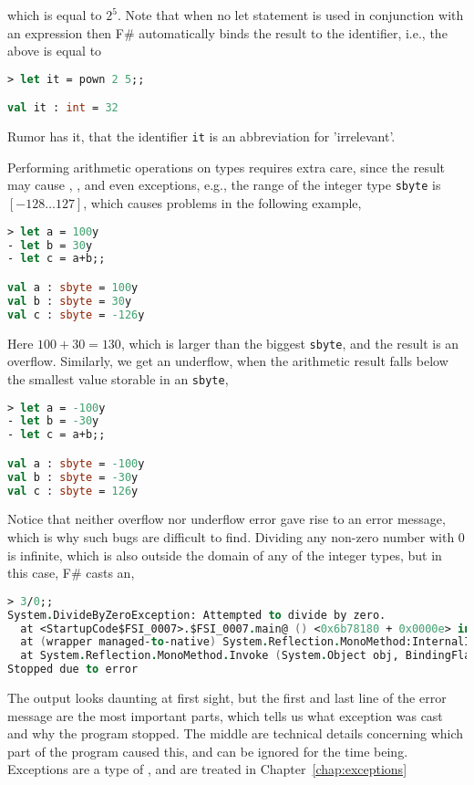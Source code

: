which is equal to $2^5$. Note that when no let statement is used in conjunction with an expression then F\# automatically binds the result to the  identifier, i.e., the above is equal to
%
\begin{lstlisting}[language=fsharp,caption={fsharpi, the equivalent to the irrelevant identifier.}]
  > let it = pown 2 5;;

val it : int = 32
\end{lstlisting}
Rumor has it, that the identifier \lstinline|it| is an abbreviation for 'irrelevant'.

Performing arithmetic operations on  types requires extra care, since the result may cause , , and even exceptions, e.g., the range of the integer type \lstinline|sbyte| is $[-128\ldots 127]$, which causes problems in the following example,
%
\begin{lstlisting}[language=fsharp,caption={fsharpi, adding integers may cause overflow.},label=overflow]
> let a = 100y 
- let b = 30y 
- let c = a+b;;

val a : sbyte = 100y
val b : sbyte = 30y
val c : sbyte = -126y
\end{lstlisting}
Here $100+30=130$, which is larger than the biggest \lstinline|sbyte|, and the result is an overflow. Similarly, we get an underflow, when the arithmetic result falls below the smallest value storable in an \lstinline|sbyte|,
%
\begin{lstlisting}[language=fsharp,caption={fsharpi, subtracting integers may cause underflow}]
> let a = -100y  
- let b = -30y  
- let c = a+b;;

val a : sbyte = -100y
val b : sbyte = -30y
val c : sbyte = 126y
\end{lstlisting}
Notice that neither overflow nor underflow error gave rise to an error message, which is why such bugs are difficult to find. 
 Dividing any non-zero number with 0 is infinite, which is also outside the domain of any of the integer types, but in this case, F\# casts an,
%
\begin{lstlisting}[language=fsharp,caption={fsharpi, integer division by zero causes an exception run-time error.}]
> 3/0;; 
System.DivideByZeroException: Attempted to divide by zero.
  at <StartupCode$FSI_0007>.$FSI_0007.main@ () <0x6b78180 + 0x0000e> in <filename unknown>:0 
  at (wrapper managed-to-native) System.Reflection.MonoMethod:InternalInvoke (System.Reflection.MonoMethod,object,object[],System.Exception&)
  at System.Reflection.MonoMethod.Invoke (System.Object obj, BindingFlags invokeAttr, System.Reflection.Binder binder, System.Object[] parameters, System.Globalization.CultureInfo culture) <0x1a55ba0 + 0x000a1> in <filename unknown>:0 
Stopped due to error
\end{lstlisting}
The output looks daunting at first sight, but the first and last line of the error message are the most important parts, which tells us what exception was cast and why the program stopped. The middle are technical details concerning which part of the program caused this, and can be ignored for the time being. Exceptions are a type of , and are treated in Chapter~\ref{chap:exceptions}

